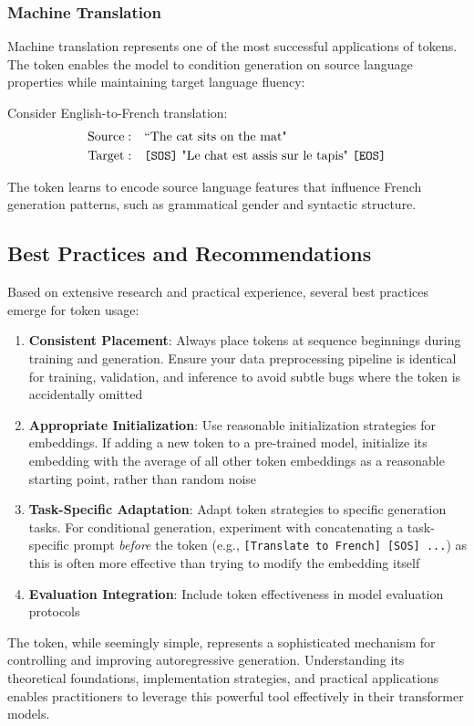 \subsubsection{Machine Translation}

Machine translation represents one of the most successful applications of \sos{} tokens. The token enables the model to condition generation on source language properties while maintaining target language fluency:

\begin{example}
Consider English-to-French translation:
\begin{align}
\text{Source}: &\quad \text{``The cat sits on the mat"} \\
\text{Target}: &\quad \text{\texttt{[SOS]}{} "Le chat est assis sur le tapis" \texttt{[EOS]}{}}
\end{align}

The \sos{} token learns to encode source language features that influence French generation patterns, such as grammatical gender and syntactic structure.
\end{example}

\subsection{Best Practices and Recommendations}

Based on extensive research and practical experience, several best practices emerge for \sos{} token usage:

\begin{enumerate}
\item \textbf{Consistent Placement}: Always place \sos{} tokens at sequence beginnings during training and generation. Ensure your data preprocessing pipeline is identical for training, validation, and inference to avoid subtle bugs where the \sos{} token is accidentally omitted
\item \textbf{Appropriate Initialization}: Use reasonable initialization strategies for \sos{} embeddings. If adding a new \sos{} token to a pre-trained model, initialize its embedding with the average of all other token embeddings as a reasonable starting point, rather than random noise
\item \textbf{Task-Specific Adaptation}: Adapt \sos{} token strategies to specific generation tasks. For conditional generation, experiment with concatenating a task-specific prompt \emph{before} the \sos{} token (e.g., \texttt{[Translate to French] [SOS] ...}) as this is often more effective than trying to modify the \sos{} embedding itself
\item \textbf{Evaluation Integration}: Include \sos{} token effectiveness in model evaluation protocols
\end{enumerate}

The \sos{} token, while seemingly simple, represents a sophisticated mechanism for controlling and improving autoregressive generation. Understanding its theoretical foundations, implementation strategies, and practical applications enables practitioners to leverage this powerful tool effectively in their transformer models.